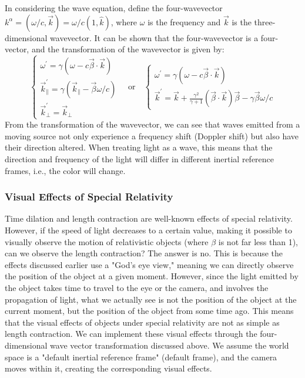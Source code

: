 \documentclass{article}
\begin{document}
In considering the wave equation, define the four-wavevector $k^{\alpha} = (\omega / c, \vec{k}) = \omega / c (1, \hat{k})$, where $\omega$ is the frequency and $\vec{k}$ is the three-dimensional wavevector. It can be shown that the four-wavevector is a four-vector, and the transformation of the wavevector is given by:
$$ \begin{cases} 
\omega^{'} = \gamma (\omega - c \vec{\beta} \cdot \vec{k}) \\
\vec{k}^{'}_{\parallel} = \gamma (\vec{k}_{\parallel} - \vec{\beta} \omega / c) \\
\vec{k}^{'}_{\perp} = \vec{k}_{\perp} 
\end{cases} \quad \text{or} \quad 
\begin{cases} 
\omega^{'} = \gamma (\omega - c \vec{\beta} \cdot \vec{k}) \\
\vec{k}^{'} = \vec{k} + \frac{\gamma^2} {\gamma + 1} (\vec{\beta} \cdot \vec{k}) \vec{\beta} - \gamma \vec{\beta} \omega / c 
\end{cases} $$
From the transformation of the wavevector, we can see that waves emitted from a moving source not only experience a frequency shift (Doppler shift) but also have their direction altered. When treating light as a wave, this means that the direction and frequency of the light will differ in different inertial reference frames, i.e., the color will change.

\subsubsection*{Visual Effects of Special Relativity}

Time dilation and length contraction are well-known effects of special relativity. However, if the speed of light decreases to a certain value, making it possible to visually observe the motion of relativistic objects (where $\beta$ is not far less than 1), can we observe the length contraction? The answer is no. This is because the effects discussed earlier use a "God's eye view," meaning we can directly observe the position of the object at a given moment. However, since the light emitted by the object takes time to travel to the eye or the camera, and involves the propagation of light, what we actually see is not the position of the object at the current moment, but the position of the object from some time ago. This means that the visual effects of objects under special relativity are not as simple as length contraction. We can implement these visual effects through the four-dimensional wave vector transformation discussed above. We assume the world space is a "default inertial reference frame" (default frame), and the camera moves within it, creating the corresponding visual effects.
\end{document}
